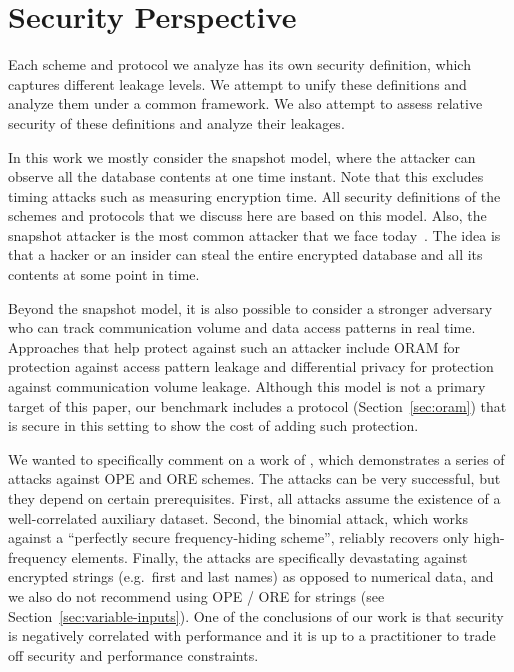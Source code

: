 \section{Security Perspective}\label{sec:security}

	Each scheme and protocol we analyze has its own security definition, which captures different leakage levels.
	We attempt to unify these definitions and analyze them under a common framework.
	We also attempt to assess relative security of these definitions and analyze their leakages.

	In this work we mostly consider the snapshot model, where the attacker can observe all the database contents at one time instant.
	Note that this excludes timing attacks such as measuring encryption time.
	All security definitions of the schemes and protocols that we discuss here are based on this model.
	Also, the snapshot attacker is the most common attacker that we face today~\cite{secure-queries-overview}.
	The idea is that a hacker or an insider can steal the entire encrypted database and all its contents at some point in time.

	Beyond the snapshot model, it is also possible to consider a stronger adversary who can track communication volume and data access patterns in real time.
	Approaches that help protect against such an attacker include ORAM for protection against access pattern leakage and differential privacy for protection against communication volume leakage.
	Although this model is not a primary target of this paper, our benchmark includes a protocol (Section~\ref{sec:oram}) that is secure in this setting to show the cost of adding such protection.

	We wanted to specifically comment on a work of \textcite{leakage-abuse-grubs-2017}, which demonstrates a series of attacks against OPE and ORE schemes.
	The attacks can be very successful, but they depend on certain prerequisites.
	First, all attacks assume the existence of a well-correlated auxiliary dataset.
	Second, the binomial attack, which works against a ``perfectly secure frequency-hiding scheme'', reliably recovers only high-frequency elements.
	Finally, the attacks are specifically devastating against encrypted strings (e.g.\ first and last names) as opposed to numerical data, and we also do not recommend using OPE / ORE for strings (see Section~\ref{sec:variable-inputs}).
	One of the conclusions of our work is that security is negatively correlated with performance and it is up to a practitioner to trade off security and performance constraints.

